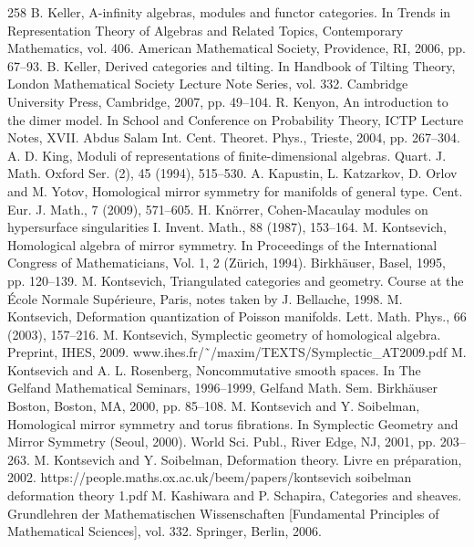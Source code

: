 \begin{thebibliography}{258}
\hypertarget{ref:135}{} B. Keller, A-infinity algebras, modules and functor categories. In Trends in Representation Theory of Algebras and Related Topics, Contemporary Mathematics, vol. 406. American Mathematical Society, Providence, RI, 2006, pp. 67–93.
\hypertarget{ref:136}{} B. Keller, Derived categories and tilting. In Handbook of Tilting Theory, London Mathematical Society Lecture Note Series, vol. 332. Cambridge University Press, Cambridge, 2007, pp. 49–104.
\hypertarget{ref:137}{} R. Kenyon, An introduction to the dimer model. In School and Conference on Probability Theory, ICTP Lecture Notes, XVII. Abdus Salam Int. Cent. Theoret. Phys., Trieste, 2004, pp. 267–304.
\hypertarget{ref:138}{} A. D. King, Moduli of representations of finite-dimensional algebras. Quart. J. Math. Oxford Ser. (2), 45 (1994), 515–530.
\hypertarget{ref:139}{} A. Kapustin, L. Katzarkov, D. Orlov and M. Yotov, Homological mirror symmetry for manifolds of general type. Cent. Eur. J. Math., 7 (2009), 571–605.
\hypertarget{ref:140}{} H. Knörrer, Cohen-Macaulay modules on hypersurface singularities I. Invent. Math., 88 (1987), 153–164.
\hypertarget{ref:141}{} M. Kontsevich, Homological algebra of mirror symmetry. In Proceedings of the International Congress of Mathematicians, Vol. 1, 2 (Zürich, 1994). Birkhäuser, Basel, 1995, pp. 120–139.
\hypertarget{ref:142}{} M. Kontsevich, Triangulated categories and geometry. Course at the École Normale Supérieure, Paris, notes taken by J. Bellaıche, 1998.
\hypertarget{ref:143}{} M. Kontsevich, Deformation quantization of Poisson manifolds. Lett. Math. Phys., 66 (2003), 157–216.
\hypertarget{ref:144}{} M. Kontsevich, Symplectic geometry of homological algebra. Preprint, IHES, 2009. www.ihes.fr/˜/maxim/TEXTS/Symplectic\_AT2009.pdf
\hypertarget{ref:145}{} M. Kontsevich and A. L. Rosenberg, Noncommutative smooth spaces. In The Gelfand Mathematical Seminars, 1996–1999, Gelfand Math. Sem. Birkhäuser Boston, Boston, MA, 2000, pp. 85–108.
\hypertarget{ref:146}{} M. Kontsevich and Y. Soibelman, Homological mirror symmetry and torus fibrations. In Symplectic Geometry and Mirror Symmetry (Seoul, 2000). World Sci. Publ., River Edge, NJ, 2001, pp. 203–263.
\hypertarget{ref:147}{} M. Kontsevich and Y. Soibelman, Deformation theory. Livre en préparation, 2002. https://people.maths.ox.ac.uk/beem/papers/kontsevich soibelman deformation theory 1.pdf
\hypertarget{ref:148}{} M. Kashiwara and P. Schapira, Categories and sheaves. Grundlehren der Mathematischen Wissenschaften [Fundamental Principles of Mathematical Sciences], vol. 332. Springer, Berlin, 2006.

\end{thebibliography}
